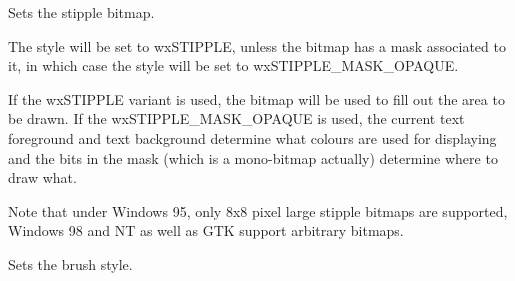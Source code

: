

\label{wxbrushsetstipple}


Sets the stipple bitmap.




The style will be set to wxSTIPPLE, unless the bitmap has a mask associated
to it, in which case the style will be set to wxSTIPPLE\_MASK\_OPAQUE.

If the wxSTIPPLE variant is used, the bitmap will be used to fill out the
area to be drawn. If the wxSTIPPLE\_MASK\_OPAQUE is used, the current
text foreground and text background determine what colours are used for
displaying and the bits in the mask (which is a mono-bitmap actually)
determine where to draw what.

Note that under Windows 95, only 8x8 pixel large stipple bitmaps are
supported, Windows 98 and NT as well as GTK support arbitrary bitmaps.




\label{wxbrushsetstyle}


Sets the brush style.





